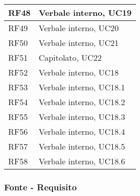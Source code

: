\begin{center}
\begin{longtable}{|C{5cm}|C{5cm}|}
        \hline
        RF48 & Verbale interno, UC19 \\
        \hline
        RF49 & Verbale interno, UC20 \\
        \hline
        RF50 & Verbale interno, UC21 \\
        \hline
        RF51 & Capitolato, UC22 \\
        \hline
        RF52 & Verbale interno, UC18 \\
        \hline
        RF53 & Verbale interno, UC18.1 \\
        \hline
        RF54 & Verbale interno, UC18.2 \\
        \hline
        RF55 & Verbale interno, UC18.3 \\
        \hline
        RF56 & Verbale interno, UC18.4 \\
        \hline
        RF57 & Verbale interno, UC18.5 \\
        \hline
        RF58 & Verbale interno, UC18.6 \\
        \hline
    \end{longtable}
\end{center}


  \subsubsection{Fonte - Requisito}

